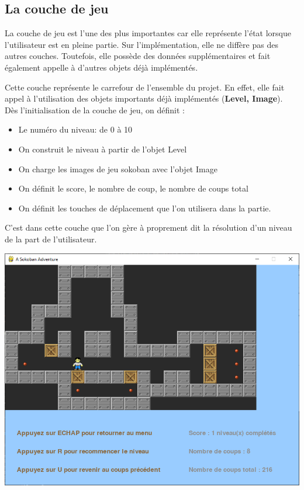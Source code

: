 \documentclass[a4paper,12pt]{article} %
\begin{document}
\subsection{La couche de jeu}

La couche de jeu est l'une des plus importantes car elle représente l'état lorsque l'utilisateur est en pleine partie. Sur l'implémentation, elle ne diffère pas des autres couches. Toutefois, elle possède des données supplémentaires et fait également appelle à d'autres objets déjà implémentés.

Cette couche représente le carrefour de l'ensemble du projet. En effet, elle fait appel à l'utilisation des objets importants déjà implémentés (\textbf{Level, Image}).
\\
Dès l'initialisation de la couche de jeu, on définit :

\begin{itemize}
	\item Le numéro du niveau: de 0 à 10
	\item On construit le niveau à partir de l'objet Level
	\item On charge les images de jeu sokoban avec l'objet Image
	\item On définit le score, le nombre de coup, le nombre de coups total
	\item On définit les touches de déplacement que l'on utilisera dans la partie.
\end{itemize}
C'est dans cette couche que l'on gère à proprement dit la résolution d'un niveau de la part de l'utilisateur.
\begin{center}
	\includegraphics[scale=0.40]{images/Capture_104539.png}
\end{center}
\end{document}
